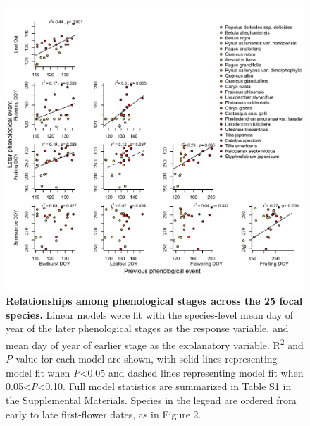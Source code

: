 \documentclass{article}
\begin{document}
  \begin{figure}[h]
  \centering
  \includegraphics{../analyses/figures/latevearly_rp_col_legend_ROY_ripefruit.pdf}
  
  \caption{\textbf{Relationships among phenological stages across the 25 focal species.} Linear models were fit with the species-level mean day of year of the later phenological stages as the response variable, and mean day of year of earlier stage as the explanatory variable. R\textsuperscript{2} and \textit{P}-value for each model are shown, with solid lines representing model fit when \textit{P}<0.05 and dashed lines representing model fit when 0.05<\textit{P}<0.10. Full model statistics are summarized in Table S1 in the Supplemental Materials. Species in the legend are ordered from early to late first-flower dates, as in Figure 2.} %
  \label{fig:latevearly}
\end{figure}
\end{document}
